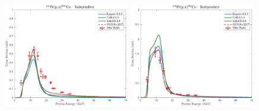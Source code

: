 \begin{figure}
  \includegraphics[width=0.49\textwidth]{./figures/58mCo.pdf}
 \includegraphics[width=0.49\textwidth]{./figures/58gCo.pdf}

\vspace{-20pt} 
\end{figure}



